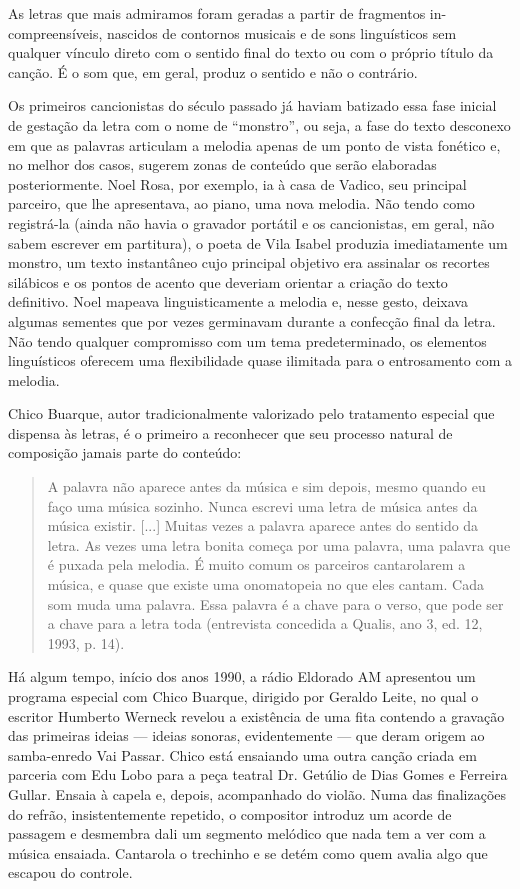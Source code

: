 As letras que mais admiramos foram geradas a partir de fragmentos in-
compreensíveis, nascidos de contornos musicais e de sons linguísticos
sem qualquer vínculo direto com o sentido final do texto ou com o
próprio título da canção. É o som que, em geral, produz o sentido e não
o contrário.

Os primeiros cancionistas do século passado já haviam batizado essa fase
inicial de gestação da letra com o nome de ``monstro'', ou seja, a fase
do texto desconexo em que as palavras articulam a melodia apenas de um
ponto de vista fonético e, no melhor dos casos, sugerem zonas de
conteúdo que serão elaboradas posteriormente. Noel Rosa, por exemplo, ia
à casa de Vadico, seu principal parceiro, que lhe apresentava, ao piano,
uma nova melodia. Não tendo como registrá-la (ainda não havia o gravador
portátil e os cancionistas, em geral, não sabem escrever em partitura),
o poeta de Vila Isabel produzia imediatamente um monstro, um texto
instantâneo cujo principal objetivo era assinalar os recortes silábicos
e os pontos de acento que deveriam orientar a criação do texto
definitivo. Noel mapeava linguisticamente a melodia e, nesse gesto,
deixava algumas sementes que por vezes germinavam durante a confecção
final da letra. Não tendo qualquer compromisso com um tema
predeterminado, os elementos linguísticos oferecem uma flexibilidade
quase ilimitada para o entrosamento com a melodia.

Chico Buarque, autor tradicionalmente valorizado pelo tratamento
especial que dispensa às letras, é o primeiro a reconhecer que seu
processo natural de composição jamais parte do conteúdo:

\begin{quote}
A palavra não aparece antes da música e sim depois, mesmo quando eu faço
uma música sozinho. Nunca escrevi uma letra de música antes da música
existir. {[}...{]} Muitas vezes a palavra aparece antes do sentido da
letra. As vezes uma letra bonita começa por uma palavra, uma palavra que
é puxada pela melodia. É muito comum os parceiros cantarolarem a música,
e quase que existe uma onomatopeia no que eles cantam. Cada som muda uma
palavra. Essa palavra é a chave para o verso, que pode ser a chave para
a letra toda (entrevista concedida a Qualis, ano 3, ed. 12, 1993, p.
14).
\end{quote}

Há algum tempo, início dos anos 1990, a rádio Eldorado AM apresentou um
programa especial com Chico Buarque, dirigido por Geraldo Leite, no qual
o escritor Humberto Werneck revelou a existência de uma fita contendo a
gravação das primeiras ideias --- ideias sonoras, evidentemente --- que
deram origem ao samba-enredo Vai Passar. Chico está ensaiando uma outra
canção criada em parceria com Edu Lobo para a peça teatral Dr. Getúlio
de Dias Gomes e Ferreira Gullar. Ensaia à capela e, depois, acompanhado
do violão. Numa das finalizações do refrão, insistentemente repetido, o
compositor introduz um acorde de passagem e desmembra dali um segmento
melódico que nada tem a ver com a música ensaiada. Cantarola o trechinho
e se detém como quem avalia algo que escapou do controle.

